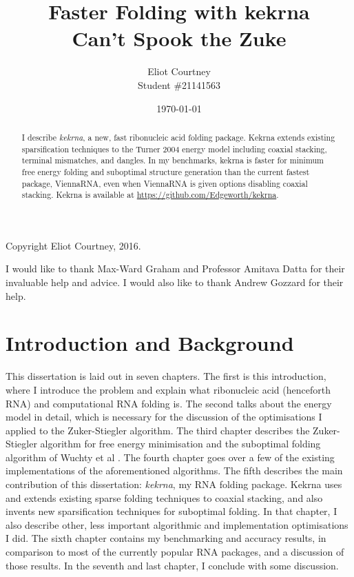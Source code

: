 \documentclass{cshonours}
\title{Faster Folding with kekrna \\ \normalsize Can't Spook the Zuke}
\author{Eliot Courtney \\ Student \#21141563}
\date{\today}
\begin{document}
\maketitle
\begin{abstract}
I describe \emph{kekrna}, a new, fast ribonucleic acid folding package. Kekrna extends existing sparsification techniques to the Turner 2004 energy model including coaxial stacking, terminal mismatches, and dangles. In my benchmarks, kekrna is faster for minimum free energy folding and suboptimal structure generation than the current fastest package, ViennaRNA, even when ViennaRNA is given options disabling coaxial stacking. Kekrna is available at \url{https://github.com/Edgeworth/kekrna}.
\end{abstract}

\pagebreak
\vspace*{8cm}
\begin{center}
Copyright Eliot Courtney, 2016.
\end{center}

\begin{acknowledgements}
I would like to thank Max-Ward Graham and Professor Amitava Datta for their invaluable help and advice. I would also like to thank Andrew Gozzard for their help.
\end{acknowledgements}

\tableofcontents
\listoftables
\listoffigures
\allowdisplaybreaks

\chapter{Introduction and Background}
This dissertation is laid out in seven chapters. The first is this introduction, where I introduce the problem and explain what ribonucleic acid (henceforth RNA) and computational RNA folding is. The second talks about the energy model in detail, which is necessary for the discussion of the optimisations I applied to the Zuker-Stiegler algorithm. The third chapter describes the Zuker-Stiegler algorithm for free energy minimisation \cite{zukerDp} and the suboptimal folding algorithm of Wuchty et al \cite{wuchtySuboptimal}. The fourth chapter goes over a few of the existing implementations of the aforementioned algorithms. The fifth describes the main contribution of this dissertation: \emph{kekrna}, my RNA folding package. Kekrna uses and extends existing sparse folding techniques \cite{backofenSparseFolding, wexlerSparseFolding, willSparseFolding} to coaxial stacking, and also invents new sparsification techniques for suboptimal folding. In that chapter, I also describe other, less important algorithmic and implementation optimisations I did. The sixth chapter contains my benchmarking and accuracy results, in comparison to most of the currently popular RNA packages, and a discussion of those results. In the seventh and last chapter, I conclude with some discussion.
\end{document}

